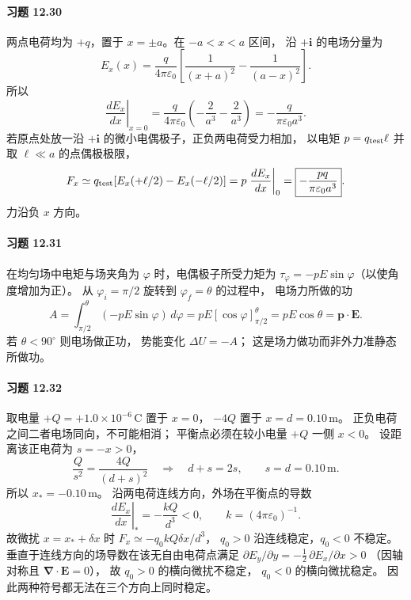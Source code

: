 \paragraph{习题 12.30}
两点电荷均为 \(+q\)，置于
\(x=\pm a\)。在 \(-a<x<a\) 区间，
沿 \(+\boldsymbol i\) 的电场分量为
\[
 E_x(x)=\frac{q}{4\pi\varepsilon_0}
 \left[\frac1{(x+a)^2}-\frac1{(a-x)^2}\right].
\]
所以
\[
 \left.\frac{dE_x}{dx}\right|_{x=0}
 =\frac{q}{4\pi\varepsilon_0}
 \left(-\frac2{a^3}-\frac2{a^3}\right)
 =\boxed{-\frac{q}{\pi\varepsilon_0a^3}}.
\]
若原点处放一沿 \(+\boldsymbol i\)
的微小电偶极子，正负两电荷受力相加，
以电矩 \(p=q_{\rm test}\ell\)
并取 \(\ell\ll a\) 的点偶极极限，
\[
 F_x\simeq q_{\rm test}
 [E_x(+\ell/2)-E_x(-\ell/2)]
 =p\left.\frac{dE_x}{dx}\right|_0
 =\boxed{-\frac{pq}{\pi\varepsilon_0a^3}}.
\]
力沿负 \(x\) 方向。

\paragraph{习题 12.31}
在均匀场中电矩与场夹角为
\(\varphi\) 时，电偶极子所受力矩为
\(\tau_\varphi=-pE\sin\varphi\)（以使角度增加为正）。
从 \(\varphi_i=\pi/2\) 旋转到
\(\varphi_f=\theta\) 的过程中，
电场力所做的功
\[
 A=\int_{\pi/2}^{\theta}(-pE\sin\varphi)\,d\varphi
 =pE[\cos\varphi]_{\pi/2}^{\theta}
 =\boxed{pE\cos\theta=\boldsymbol p\cdot\boldsymbol E}.
\]
若 \(\theta<90^\circ\) 则电场做正功，
势能变化 \(\Delta U=-A\)；
这是场力做功而非外力准静态所做功。

\paragraph{习题 12.32}
取电量 \(+Q=+1.0\times10^{-6}\,\mathrm C\)
置于 \(x=0\)，
\(-4Q\) 置于 \(x=d=0.10\,\mathrm m\)。
正负电荷之间二者电场同向，不可能相消；
平衡点必须在较小电量 \(+Q\) 一侧 \(x<0\)。
设距离该正电荷为 \(s=-x>0\)，
\[
 \frac{Q}{s^2}=\frac{4Q}{(d+s)^2}
 \quad\Longrightarrow\quad d+s=2s,
 \qquad \boxed{s=d=0.10\,\mathrm m}.
\]
所以 \(x_*=-0.10\,\mathrm m\)。
沿两电荷连线方向，外场在平衡点的导数
\[
 \left.\frac{dE_x}{dx}\right|_*
 =-\frac{kQ}{d^3}<0,\qquad
 k=(4\pi\varepsilon_0)^{-1}.
\]
故微扰 \(x=x_*+\delta x\) 时
\(F_x\simeq-q_0kQ\delta x/d^3\)，
\(q_0>0\) 沿连线稳定，\(q_0<0\) 不稳定。
垂直于连线方向的场导数在该无自由电荷点满足
\(\partial E_y/\partial y
 =-\frac12\,\partial E_x/\partial x>0\)
（因轴对称且 \(\boldsymbol\nabla\cdot\boldsymbol E=0\)），
故 \(q_0>0\) 的横向微扰不稳定，
\(q_0<0\) 的横向微扰稳定。
因此两种符号都无法在三个方向上同时稳定。

